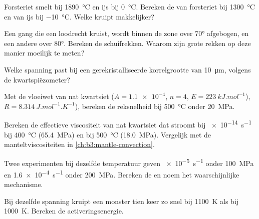 \begin{exercise}[$\star$]\label{exo:b3:deformation-mechanisms:1}
Forsteriet smelt bij \qty{1890}{\celsius} en ijs bij \qty{0}{\celsius}. Bereken
de  van forsteriet bij \qty{1300}{\celsius} en van ijs bij
\qty{-10}{\celsius}. Welke kruipt makkelijker?
\end{exercise}

\begin{exercise}[$\star$]\label{exo:b3:deformation-mechanisms:2}
Een gang die een  loodrecht kruist, wordt binnen de zone
over \ang{70} afgebogen, en een andere over \ang{80}. Bereken de schuifrekken.
Waarom zijn grote rekken op deze manier moeilijk te meten?
\end{exercise}

\begin{exercise}[$\star$]\label{exo:b3:deformation-mechanisms:3}
Welke spanning past bij een gerekristalliseerde korrelgrootte van
\qty{10}{\micro m}, volgens de kwartspiëzometer?
\end{exercise}

\begin{exercise}[$\star$]\label{exo:b3:deformation-mechanisms:4}
Met de vloeiwet van nat kwartsiet ($A = \num{1.1e-4}$, $n = 4$, $E =
\qty{223}{kJ.mol^{-1}}$), $R = \qty{8.314}{J.mol^{-1}.K^{-1}}$), bereken de
reksnelheid bij \qty{500}{\celsius} onder \qty{20}{MPa}.
\end{exercise}

\begin{exercise}[$\star\star$]\label{exo:b3:deformation-mechanisms:5}
Bereken de effectieve viscositeit van nat kwartsiet dat stroomt bij \qty{e-14}{s^{-1}}
bij \qty{400}{\celsius} (\qty{65.4}{MPa}) en bij \qty{500}{\celsius}
(\qty{18.0}{MPa}). Vergelijk met de manteltviscositeiten
in \cref{ch:b3:mantle-convection}.
\end{exercise}

\begin{exercise}[$\star\star$]\label{exo:b3:deformation-mechanisms:6}
Twee experimenten bij dezelfde temperatuur geven \qty{e-5}{s^{-1}} onder
\qty{100}{MPa} en \qty{1.6e-4}{s^{-1}} onder \qty{200}{MPa}. Bereken de
 en noem het waarschijnlijke mechanisme.
\end{exercise}

\begin{exercise}[$\star\star$]\label{exo:b3:deformation-mechanisms:7}
Bij dezelfde spanning kruipt een monster tien keer zo snel bij \qty{1100}{K} als
bij \qty{1000}{K}. Bereken de activeringsenergie.
\end{exercise}

